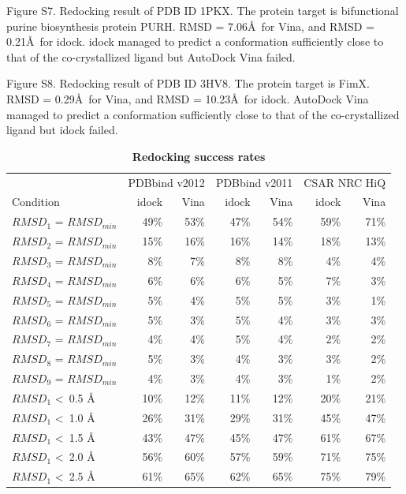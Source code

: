 Figure S7. Redocking result of PDB ID 1PKX. The protein target is bifunctional purine biosynthesis protein PURH. RMSD = 7.06\AA\ for Vina, and RMSD = 0.21\AA\ for idock. idock managed to predict a conformation sufficiently close to that of the co-crystallized ligand but AutoDock Vina failed.

Figure S8. Redocking result of PDB ID 3HV8. The protein target is FimX. RMSD = 0.29\AA\ for Vina, and RMSD = 10.23\AA\ for idock. AutoDock Vina managed to predict a conformation sufficiently close to that of the co-crystallized ligand but idock failed.

\begin{table}[!ht]
\caption{
\bf{Redocking success rates}}
\begin{tabular}{lrrrrrr}
\hline
& \multicolumn{2}{c}{PDBbind v2012} & \multicolumn{2}{c}{PDBbind v2011} & \multicolumn{2}{c}{CSAR NRC HiQ}\\
Condition & idock & Vina & idock & Vina & idock & Vina\\
\hline
$RMSD_1$ = $RMSD_{min}$ & 49\% & 53\% & 47\% & 54\% & 59\% & 71\%\\
$RMSD_2$ = $RMSD_{min}$ & 15\% & 16\% & 16\% & 14\% & 18\% & 13\%\\
$RMSD_3$ = $RMSD_{min}$ &  8\% &  7\% &  8\% &  8\% &  4\% &  4\%\\
$RMSD_4$ = $RMSD_{min}$ &  6\% &  6\% &  6\% &  5\% &  7\% &  3\%\\
$RMSD_5$ = $RMSD_{min}$ &  5\% &  4\% &  5\% &  5\% &  3\% &  1\%\\
$RMSD_6$ = $RMSD_{min}$ &  5\% &  3\% &  5\% &  4\% &  3\% &  3\%\\
$RMSD_7$ = $RMSD_{min}$ &  4\% &  4\% &  5\% &  4\% &  2\% &  2\%\\
$RMSD_8$ = $RMSD_{min}$ &  5\% &  3\% &  4\% &  3\% &  3\% &  2\%\\
$RMSD_9$ = $RMSD_{min}$ &  4\% &  3\% &  4\% &  3\% &  1\% &  2\%\\
\noalign{\smallskip}
$RMSD_1$ \textless\ 0.5 \AA & 10\% & 12\% & 11\% & 12\% & 20\% & 21\%\\
$RMSD_1$ \textless\ 1.0 \AA & 26\% & 31\% & 29\% & 31\% & 45\% & 47\%\\
$RMSD_1$ \textless\ 1.5 \AA & 43\% & 47\% & 45\% & 47\% & 61\% & 67\%\\
$RMSD_1$ \textless\ 2.0 \AA & 56\% & 60\% & 57\% & 59\% & 71\% & 75\%\\
$RMSD_1$ \textless\ 2.5 \AA & 61\% & 65\% & 62\% & 65\% & 75\% & 79\%\\

\end{tabular}
\end{table}
